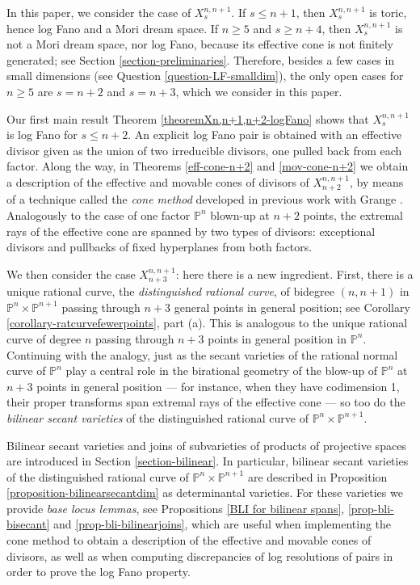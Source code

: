 \documentclass[a4paper,11pt]{article}
\newcommand{\PP}{\mathbb P}
\newcommand{\ourproduct}{\mathbb P^n \times \mathbb P^{n+1}}
\newcommand{\ourproductblowup}[1]{X^{n,n+1}_{#1}}
\newcommand{\ourproductblowuptwo}{X^{n,n+1}_{n+2}}
\newcommand{\ourproductblowupthree}{X^{n,n+1}_{n+3}}
\begin{document}
In this paper, we consider the case of $\ourproductblowup{s}$.  If $s\le n+1$, then $\ourproductblowup{s}$ is toric, hence log Fano and a Mori dream space. If $n\ge5$ and $s\ge n+4$, then $\ourproductblowup{s}$ is not a Mori dream space, nor log Fano, because its effective cone is not finitely generated; see Section \ref{section-preliminaries}.
Therefore, besides a few cases in small dimensions (see Question \ref{question-LF-smalldim}), the only open cases for $n\ge 5$ are $s= n+2$ and $s=n+3$, which we consider in this paper.

Our first main result Theorem \ref{theoremXn,n+1,n+2-logFano} shows that $\ourproductblowup{s}$ is log Fano for $s \leq n+2$. An explicit log Fano pair is obtained with an effective divisor given as the union of two irreducible divisors, one pulled back from each factor. Along the way, in Theorems \ref{eff-cone-n+2} and \ref{mov-cone-n+2} we obtain a description of the effective and movable cones of divisors of $\ourproductblowuptwo$, by means of a technique called the \emph{cone method} developed in previous work with Grange \cite{GPP21}. Analogously to the case of one factor $\PP^n$ blown-up at $n+2$ points, the extremal rays of the effective cone are spanned by two types of divisors: exceptional divisors and pullbacks of fixed hyperplanes from both factors. 

We then consider the case $\ourproductblowupthree$: here there is a new ingredient. First, there is a unique rational curve, the \emph{distinguished rational curve}, of bidegree $(n,n+1)$ in $\ourproduct$ passing through $n+3$ general points in general position; see Corollary \ref{corollary-ratcurvefewerpoints}, part (a). This is analogous to the unique rational curve of degree $n$ passing through $n+3$ points in general position in $\PP^n$. 
Continuing with the analogy, just as the secant varieties of the rational normal curve of $\PP^n$ play a central role in the birational geometry of the blow-up of $\PP^n$ at $n+3$ points in general position --- for instance, when they have codimension 1, their proper transforms span extremal rays of the effective cone \cite{Mukai05,CT06,BDPn+3} --- so too do the \emph{bilinear secant varieties} of the distinguished rational curve of $\ourproduct$.

Bilinear secant varieties and joins of subvarieties of products of projective spaces are introduced in Section \ref{section-bilinear}. In particular,  bilinear secant varieties of the distinguished rational curve of $\PP^n\times\PP^{n+1}$ are described in Proposition \ref{proposition-bilinearsecantdim} as determinantal varieties. For these varieties we provide \emph{base locus lemmas}, see Propositions \ref{BLI for bilinear spans}, \ref{prop-bli-bisecant} and \ref{prop-bli-bilinearjoins},  which are useful when implementing the cone method to obtain a description of the effective and movable cones of divisors, as well as when computing discrepancies of log resolutions of pairs in order to prove the log Fano property.
\end{document}
